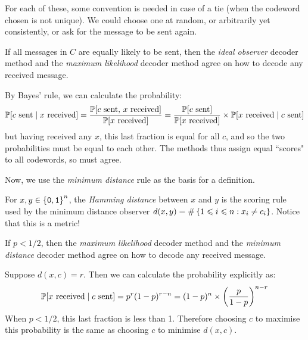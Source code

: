 \documentclass{article}
\begin{document}
\begin{note}
	For each of these, some convention is needed in case of a tie
	(when the codeword chosen is not unique).
	We could choose one at random,
	or arbitrarily yet consistently,
	or ask for the message to be sent again.
\end{note}

\begin{proposition}
	\label{decoder-agreement-ideal-observer-max-likelihood}
    If all messages in $C$ are equally likely to be sent,
    then the \textit{ideal observer} decoder method
    and the \textit{maximum likelihood} decoder method
    agree on how to decode any received message.
\end{proposition}

\begin{prf}
    By Bayes' rule, we can calculate the probability:
    \[
	\P[c \text{ sent} \mid x \text{ received}]
	=
	\frac
	{\P[c \text{ sent}, \, x \text{ received}]}
	{\P[x \text{ received}]}
	=
	\frac
	{\P[c \text{ sent}]}
	{\P[x \text{ received}]}
	\times \P[x \text{ received} \mid c \text{ sent}]
	\]
	but having received any $x$,
	this last fraction is equal for all $c$,
	and so the two probabilities must be equal to each other.
	The methods thus assign equal ``scores" to all codewords,
	so must agree.
\end{prf}

Now, we use the \textit{minimum distance} rule as the basis for a definition.

\begin{definition}
	\label{hamming-distance}
    For $x, y \in \binset^n$,
    the \textit{Hamming distance} between $x$ and $y$
    is the scoring rule used by the minimum distance observer
    $d(x, y) = \#\set{1 \leq i \leq n : x_i \neq c_i}$.
    Notice that this is a metric!
\end{definition}

\begin{proposition}
	\label{decoder-agreement-max-likelihood-min-distance}
    If $p < 1/2$,
    then the \textit{maximum likelihood} decoder method
    and the \textit{minimum distance} decoder method
    agree on how to decode any received message.
\end{proposition}

\begin{prf}
	Suppose $d(x, c) = r$.
	Then we can calculate the probability explicitly as:
	\[
	\P[x \text{ received} \mid c \text{ sent}] =
	p^r(1-p)^{r-n} = (1-p)^n
	\times \left( \frac{p}{1-p} \right)^{n-r}
	\]
	When $p < 1/2$,
	this last fraction is less than 1.
	Therefore choosing $c$ to maximise this probability
	is the same as choosing $c$ to minimise $d(x, c)$.
\end{prf}
\end{document}
